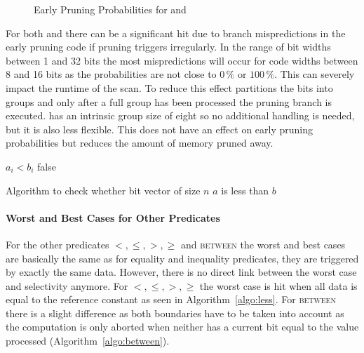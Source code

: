 \begin{figure}[h] \center
{}
\caption{Early Pruning Probabilities for \bwv{} and \bs{}}
\label{fig:earlypruningprobabilities}
\end{figure}

For both \bwv{} and \bs{} there can be a significant hit due to branch
mispredictions in the early pruning code if pruning triggers irregularly. In the
range of bit widths between 1 and 32 bits the most mispredictions will occur for
code widths between 8 and 16 bits as the probabilities are not close to $0\,\%$
or $100\,\%$. This can severely impact the runtime of the scan.  To
reduce this effect \bwv{} partitions the bits into groups and only after a full
group has been processed the pruning branch is executed. \bs{} has an intrinsic
group size of eight so no additional handling is needed, but it is also less
flexible. This does not have an effect on early pruning probabilities but
reduces the amount of memory pruned away.

\begin{algorithm}[h]
\begin{algorithmic}[1]
        \State \Return $a_i < b_i$
      \EndIf
    \EndFor
    \State \Return false
  \EndProcedure
\end{algorithmic}
\caption{Algorithm to check whether bit vector of size $n$ $a$ is less than $b$}
\label{algo:less}
\end{algorithm}

\paragraph{Worst and Best Cases for Other Predicates}

For the other predicates $<,\le,>,\ge$ and \textsc{between} the worst and best
cases are basically the same as for equality and inequality predicates, they are
triggered by exactly the same data.  However, there is no direct link between
the worst case and selectivity anymore. For $<,\le,>,\ge$ the worst case is hit
when all data is equal to the reference constant as seen in
Algorithm~\ref{algo:less}. For \textsc{between} there is a slight difference as
both boundaries have to be taken into account as the computation is only aborted
when neither has a current bit equal to the value processed
(Algorithm~\ref{algo:between}).

